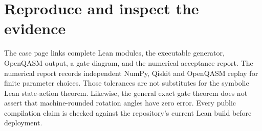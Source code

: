 \documentclass[11pt]{article}
\begin{document}
\section{Reproduce and inspect the evidence}
The case page links complete Lean modules, the executable generator,
OpenQASM output, a gate diagram, and the numerical acceptance report.
The numerical report records independent NumPy, Qiskit and OpenQASM replay
for finite parameter choices. Those tolerances are not substitutes for
the symbolic Lean state-action theorem. Likewise, the general exact gate
theorem does not assert that machine-rounded rotation angles have zero error.
Every public compilation claim is checked against the repository's current
Lean build before deployment.
\end{document}
